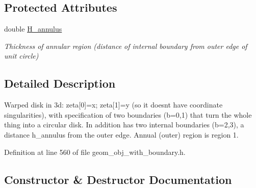 \subsection*{Protected Attributes}
\begin{DoxyCompactItemize}
\item 
double \hyperlink{classoomph_1_1WarpedCircularDiskWithAnnularInternalBoundary_a2c7fdc177314c535c7ad742ecae10204}{H\+\_\+annulus}
\begin{DoxyCompactList}\small\item\em Thickness of annular region (distance of internal boundary from outer edge of unit circle) \end{DoxyCompactList}\end{DoxyCompactItemize}


\subsection{Detailed Description}
Warped disk in 3d\+: zeta\mbox{[}0\mbox{]}=x; zeta\mbox{[}1\mbox{]}=y (so it doesn\textquotesingle{}t have coordinate singularities), with specification of two boundaries (b=0,1) that turn the whole thing into a circular disk. In addition has two internal boundaries (b=2,3), a distance h\+\_\+annulus from the outer edge. Annual (outer) region is region 1. 

Definition at line 560 of file geom\+\_\+obj\+\_\+with\+\_\+boundary.\+h.



\subsection{Constructor \& Destructor Documentation}
\mbox{\label{classoomph_1_1WarpedCircularDiskWithAnnularInternalBoundary_a97d0a5b064c7d8eba3a99e1a84a1de69}} 
